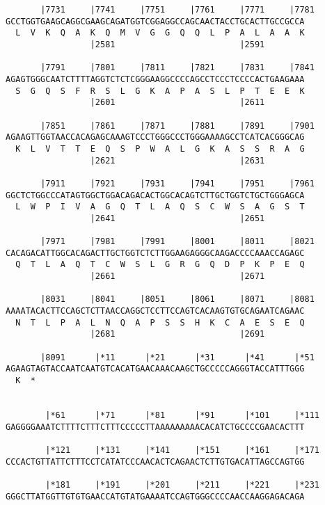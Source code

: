 \documentclass{article}
\begin{document}
\begin{Verbatim}
       |7731     |7741     |7751     |7761     |7771     |7781
GCCTGGTGAAGCAGGCGAAGCAGATGGTCGGAGGCCAGCAACTACCTGCACTTGCCGCCA
  L  V  K  Q  A  K  Q  M  V  G  G  Q  Q  L  P  A  L  A  A  K
                 |2581                         |2591        
  
       |7791     |7801     |7811     |7821     |7831     |7841
AGAGTGGGCAATCTTTTAGGTCTCTCGGGAAGGCCCCAGCCTCCCTCCCCACTGAAGAAA
  S  G  Q  S  F  R  S  L  G  K  A  P  A  S  L  P  T  E  E  K
                 |2601                         |2611        
  
       |7851     |7861     |7871     |7881     |7891     |7901
AGAAGTTGGTAACCACAGAGCAAAGTCCCTGGGCCCTGGGAAAAGCCTCATCACGGGCAG
  K  L  V  T  T  E  Q  S  P  W  A  L  G  K  A  S  S  R  A  G
                 |2621                         |2631        
  
       |7911     |7921     |7931     |7941     |7951     |7961
GGCTCTGGCCCATAGTGGCTGGACAGACACTGGCACAGTCTTGCTGGTCTGCTGGGAGCA
  L  W  P  I  V  A  G  Q  T  L  A  Q  S  C  W  S  A  G  S  T
                 |2641                         |2651        
  
       |7971     |7981     |7991     |8001     |8011     |8021
CACAGACATTGGCACAGACTTGCTGGTCTCTTGGAAGAGGGCAAGACCCCAAACCAGAGC
  Q  T  L  A  Q  T  C  W  S  L  G  R  G  Q  D  P  K  P  E  Q
                 |2661                         |2671        
  
       |8031     |8041     |8051     |8061     |8071     |8081
AAAATACACTTCCAGCTCTTAACCAGGCTCCTTCCAGTCACAAGTGTGCAGAATCAGAAC
  N  T  L  P  A  L  N  Q  A  P  S  S  H  K  C  A  E  S  E  Q
                 |2681                         |2691        
  
       |8091      |*11      |*21      |*31      |*41      |*51
AGAAGTAGTACCAATCAATGTCACATGAACAAACAAGCTGCCCCCAGGGTACCATTTGGG
  K  *   
                                                            
  
        |*61      |*71      |*81      |*91      |*101     |*111
GAGGGGAAATCTTTTCTTTCTTTCCCCCTTAAAAAAAAACACATCTGCCCCGAACACTTT
                                                            
        |*121     |*131     |*141     |*151     |*161     |*171
CCCACTGTTATTCTTTCCTCATATCCCAACACTCAGAACTCTTGTGACATTAGCCAGTGG
                                                            
        |*181     |*191     |*201     |*211     |*221     |*231
GGGCTTATGGTTGTGTGAACCATGTATGAAAATCCAGTGGGCCCCAACCAAGGAGACAGA
                                                            

\end{Verbatim}
\end{document}
